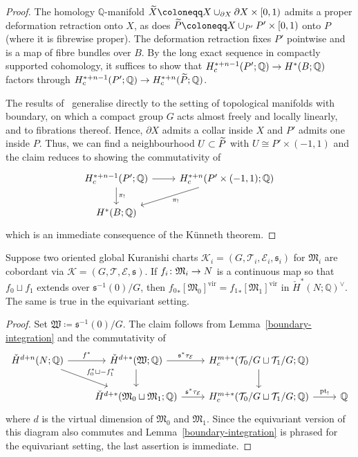 \documentclass[AHL,Unicode,longabstracts]{cedram}
\newcommand{\sub}{\subset}
\newcommand{\inv}{^{-1}}
\newcommand{\vfc}[1]{[#1]^{\virt}}
\newcommand{\cl}{\colon}
\newcommand{\pd}{\partial}
\newcommand{\chml}{\check{H}}
\newcommand{\dul}{^\vee}
\newcommand{\del}{\partial}
\newcommand{\bQ}{\mathbb{Q}}
\newcommand{\cE}{\mathcal{E}}
\newcommand{\cK}{\mathcal{K}}
\newcommand{\cT}{\mathcal{T}}
\newcommand{\fM}{\mathfrak{M}}
\newcommand{\fW}{\mathfrak{W}}
\newcommand{\fs}{\mathfrak{s}}
\DeclareMathOperator{\virt}{vir}
\DeclareMathOperator{\Pt}{pt}
\renewcommand*{\to}{\mathchoice{\longrightarrow}{\rightarrow}{\rightarrow}{\rightarrow}}
\let\oldtilde\tilde
\renewcommand*{\tilde}[1]{\mathchoice{\widetilde{#1}}{\widetilde{#1}}{\oldtilde{#1}}{\oldtilde{#1}}}
\begin{document}
\begin{proof}
The homology $\bQ$-manifold $\tilde{X} \coloneqq X\cup_{\del X} \del X\times[0,1)$ admits a proper deformation retraction onto $X$, as does $\tilde{P} \coloneqq X\cup_{P'} P'\times[0,1)$ onto $P$ (where it is fibrewise proper). The deformation retraction fixes $P'$ pointwise and is a map of fibre bundles over $B$. By the long exact sequence in compactly supported cohomology, it suffices to show that $H^{*+n-1}_c(P';\bQ)\to H^*(B;\bQ)$ factors through $H^{*+n-1}_c(P';\bQ)\to H^{*+n}_c(\tilde{P};\bQ)$.


The results of~\cite{Br62} generalise directly to the setting of topological manifolds with boundary, on which a compact group $G$ acts almost freely and locally linearly, and to fibrations thereof. Hence, $\pd X$ admits a collar inside $X$ and $P'$ admits one inside $P$. Thus, we can find a neighbourhood $U\sub \tilde{P}$ with $U \cong P'\times (-1,1)$ and the claim reduces to showing the commutativity of
\[
\begin{tikzcd}
H^{*+n-1}_c(P';\bQ)\arrow[r,] \arrow[d,"\pi_!"] & H^{*+n}_c(P'\times (-1,1);\bQ)\arrow[dl,"\pi_!"]\\
H^*(B;\bQ)
\end{tikzcd}
\]
which is an immediate consequence of the K\"unneth theorem.
\end{proof}

\begin{lemm}\label{cobordant-charts}
Suppose two oriented global Kuranishi charts $\cK_i = (G,\cT_i,\cE_i,\fs_i)$ for $\fM_i$ are cobordant via $\cK= (G,\cT,\cE,\fs)$. If $f_i \cl \fM_i \to N$ is a continuous map so that $f_0\sqcup f_1$ extends over $\fs\inv(0)/G$, then ${f_0}_*\vfc{\fM_0} = {f_1}_*\vfc{\fM_1}$ in $\chml^*(N;\bQ)\dul$. The same is true in the equivariant setting.
\end{lemm}

\begin{proof}
Set $\fW \coloneqq \fs\inv(0)/G$. The claim follows from Lemma~\ref{boundary-integration} and the commutativity of
\[
\begin{tikzcd}
\chml^{d+ n}(N;\bQ)\arrow[r,"f^*"]\arrow[dr,"f_0^*\sqcup -f_1^*"]&\chml^{d+*}(\fW;\bQ) \arrow[d,""]\arrow[r,"\fs^*\tau_{\cE}"] &H^{m+*}_c(\cT_0/G\sqcup \cT_1/G;\bQ)\arrow[d]\\
&\chml^{d+*}(\fM_0\sqcup \fM_1;\bQ)\arrow[r,"\fs^*\tau_{\cE}"] &H^{m+*}_c(\cT_0/G\sqcup \cT_1/G;\bQ)\arrow[r,"\Pt_!"]& \bQ
\end{tikzcd}
\]
where $d$ is the virtual dimension of $\fM_0$ and $\fM_1$. Since the equivariant version of this diagram also commutes and Lemma~\ref{boundary-integration} is phrased for the equivariant setting, the last assertion is immediate.
\end{proof}




\end{document}
